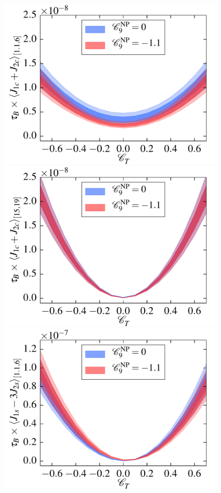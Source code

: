 \documentclass[twocolumn,epjc3]{svjour3}
\numberwithin{equation}{section}
\renewcommand{\[}{\big[}
\renewcommand{\]}{\big]}
\renewcommand{\(}{\big(}
\renewcommand{\)}{\big)}
\newlength{\relwidth}
\begin{document}
\begin{figure}
\begin{center}
    \\
    \includegraphics[width=\relwidth]{plots/pdf/ct_Kstar_J_1c_plus_J_2c1dot1to6}
    \includegraphics[width=\relwidth]{plots/pdf/ct_Kstar_J_1c_plus_J_2c15to19}
    \\
    \includegraphics[width=\relwidth]{plots/pdf/ct_Kstar_J_1s_minus_3J_2s1dot1to6}

\end{center}
\end{figure}
\end{document}
